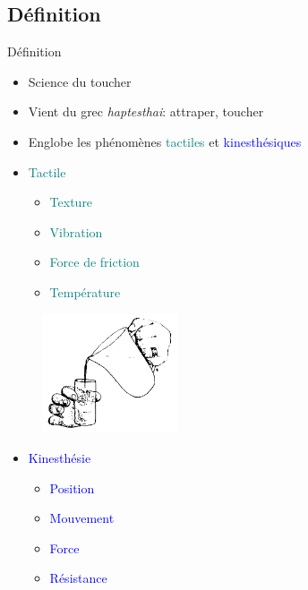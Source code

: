 \documentclass[compress, noflama]{beamer}
\begin{document}
\subsection{Définition}
{
\begin{frame}{Définition}
	\begin{itemize}
		\item Science du toucher
		\item Vient du grec \textit{haptesthai}: attraper, toucher
		\item Englobe les phénomènes \textcolor{teal}{tactiles} et \textcolor{blue}{kinesthésiques}%
	\end{itemize}
	
\begin{multicols}{3}

\begin{itemize}
\item \textcolor{teal}{Tactile}
\begin{itemize}
\item \textcolor{teal}{Texture}
\item \textcolor{teal}{Vibration}
\item \textcolor{teal}{Force de friction}
\item \textcolor{teal}{Température}
\end{itemize}
\end{itemize}

\begin{figure}
		\centering			
		\includegraphics[width=4cm]{images/haptic}
	\end{figure}

\begin{itemize}
\item \textcolor{blue}{Kinesthésie}
\begin{itemize}
\item \textcolor{blue}{Position}
\item \textcolor{blue}{Mouvement}
\item \textcolor{blue}{Force}
\item \textcolor{blue}{Résistance}
\end{itemize}
\end{itemize}

\end{multicols}	
	
\end{frame}
}
\end{document}
